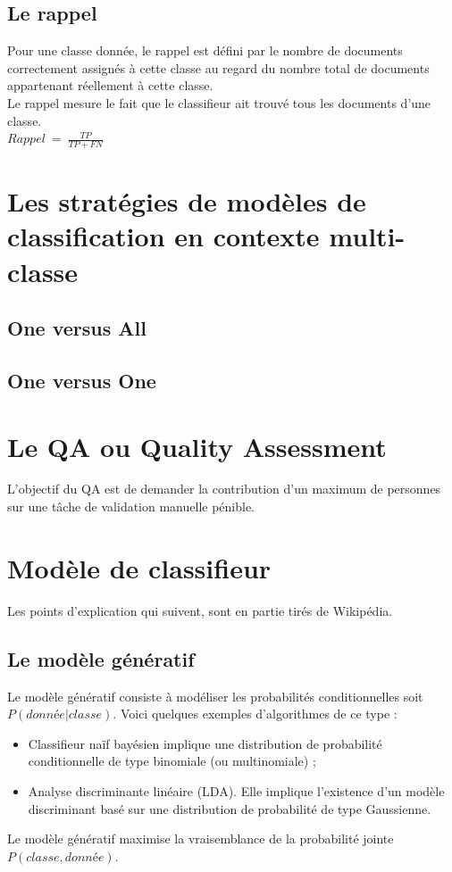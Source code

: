     \subsection{Le rappel}
    \label{annexe:rappel}
        Pour une classe donnée, le rappel est défini par le nombre de documents correctement assignés à cette classe au regard du nombre total de documents appartenant réellement à cette classe.\\
        Le rappel mesure le fait que le classifieur ait trouvé tous les documents d'une classe.\\
        $Rappel\ =\ \frac{TP}{TP+FN}$

\section{Les stratégies de modèles de classification en contexte multi-classe}
    \subsection{One versus All}
    \label{annexe:one_vs_all}

    \subsection{One versus One}
    \label{annexe:one_vs_one}


\section{Le QA ou Quality Assessment}
\label{annexe:qa}
    L'objectif du QA est de demander la contribution d'un maximum de personnes sur une tâche de validation manuelle pénible.\\

\section{Modèle de classifieur}
    Les points d'explication qui suivent, sont en partie tirés de Wikipédia\autocite{wiki_discri_gene}.
    \subsection{Le modèle génératif}
    \label{annexe:generatif}
        Le modèle génératif consiste à modéliser les probabilités conditionnelles soit $P(donnée | classe)$. Voici quelques exemples d'algorithmes de ce type :
        \begin{itemize}
            \item Classifieur naïf bayésien implique une distribution de probabilité conditionnelle de type binomiale (ou multinomiale) ;
            \item Analyse discriminante linéaire (LDA). Elle implique l'existence d'un modèle discriminant basé sur une distribution de probabilité de type Gaussienne.
        \end{itemize}
        Le modèle génératif maximise la vraisemblance de la probabilité jointe $P(classe, donnée)$.

